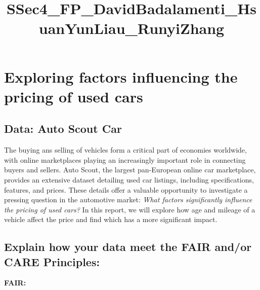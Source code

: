 \documentclass[
  letterpaper,
  DIV=11,
  numbers=noendperiod]{scrartcl}
\title{SSec4\_FP\_DavidBadalamenti\_HsuanYunLiau\_RunyiZhang}
\author{}
\date{}
\begin{document}
\maketitle


\section{Exploring factors influencing the pricing of used
cars}\label{exploring-factors-influencing-the-pricing-of-used-cars}

\subsection{Data: Auto Scout Car}\label{data-auto-scout-car}

The buying ans selling of vehicles form a critical part of economies
worldwide, with online marketplaces playing an increasingly important
role in connecting buyers and sellers. Auto Scout, the largest
pan-European online car marketplace, provides an extensive dataset
detailing used car listings, including specifications, features, and
prices. These details offer a valuable opportunity to investigate a
pressing question in the automotive market: \emph{What factors
significantly influence the pricing of used cars?} In this report, we
will explore how age and mileage of a vehicle affect the price and find
which has a more significant impact.

\subsection{\texorpdfstring{\textbf{Explain how your data meet the FAIR
and/or CARE
Principles:}}{Explain how your data meet the FAIR and/or CARE Principles:}}\label{explain-how-your-data-meet-the-fair-andor-care-principles}

\textbf{FAIR:}
\end{document}
